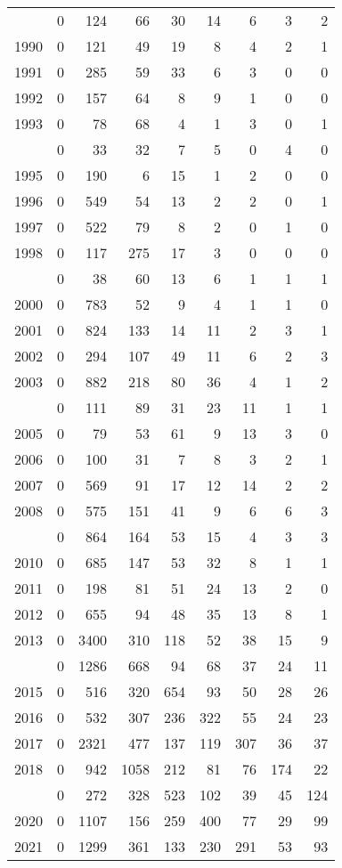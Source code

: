 \documentclass[
]{article}
\begin{document}
\begin{longtable}[t]{lrrrrrrrr}
\endfoot
\bottomrule
\endlastfoot
1989 & 0 & 124 & 66 & 30 & 14 & 6 & 3 & 2\\
1990 & 0 & 121 & 49 & 19 & 8 & 4 & 2 & 1\\
1991 & 0 & 285 & 59 & 33 & 6 & 3 & 0 & 0\\
1992 & 0 & 157 & 64 & 8 & 9 & 1 & 0 & 0\\
1993 & 0 & 78 & 68 & 4 & 1 & 3 & 0 & 1\\
\addlinespace
1994 & 0 & 33 & 32 & 7 & 5 & 0 & 4 & 0\\
1995 & 0 & 190 & 6 & 15 & 1 & 2 & 0 & 0\\
1996 & 0 & 549 & 54 & 13 & 2 & 2 & 0 & 1\\
1997 & 0 & 522 & 79 & 8 & 2 & 0 & 1 & 0\\
1998 & 0 & 117 & 275 & 17 & 3 & 0 & 0 & 0\\
\addlinespace
1999 & 0 & 38 & 60 & 13 & 6 & 1 & 1 & 1\\
2000 & 0 & 783 & 52 & 9 & 4 & 1 & 1 & 0\\
2001 & 0 & 824 & 133 & 14 & 11 & 2 & 3 & 1\\
2002 & 0 & 294 & 107 & 49 & 11 & 6 & 2 & 3\\
2003 & 0 & 882 & 218 & 80 & 36 & 4 & 1 & 2\\
\addlinespace
2004 & 0 & 111 & 89 & 31 & 23 & 11 & 1 & 1\\
2005 & 0 & 79 & 53 & 61 & 9 & 13 & 3 & 0\\
2006 & 0 & 100 & 31 & 7 & 8 & 3 & 2 & 1\\
2007 & 0 & 569 & 91 & 17 & 12 & 14 & 2 & 2\\
2008 & 0 & 575 & 151 & 41 & 9 & 6 & 6 & 3\\
\addlinespace
2009 & 0 & 864 & 164 & 53 & 15 & 4 & 3 & 3\\
2010 & 0 & 685 & 147 & 53 & 32 & 8 & 1 & 1\\
2011 & 0 & 198 & 81 & 51 & 24 & 13 & 2 & 0\\
2012 & 0 & 655 & 94 & 48 & 35 & 13 & 8 & 1\\
2013 & 0 & 3400 & 310 & 118 & 52 & 38 & 15 & 9\\
\addlinespace
2014 & 0 & 1286 & 668 & 94 & 68 & 37 & 24 & 11\\
2015 & 0 & 516 & 320 & 654 & 93 & 50 & 28 & 26\\
2016 & 0 & 532 & 307 & 236 & 322 & 55 & 24 & 23\\
2017 & 0 & 2321 & 477 & 137 & 119 & 307 & 36 & 37\\
2018 & 0 & 942 & 1058 & 212 & 81 & 76 & 174 & 22\\
\addlinespace
2019 & 0 & 272 & 328 & 523 & 102 & 39 & 45 & 124\\
2020 & 0 & 1107 & 156 & 259 & 400 & 77 & 29 & 99\\
2021 & 0 & 1299 & 361 & 133 & 230 & 291 & 53 & 93\\*
\end{longtable}
\end{document}
